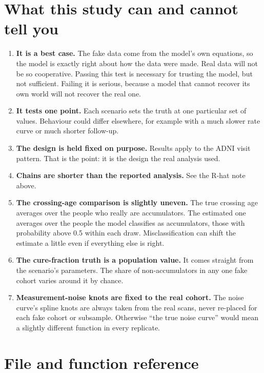 \documentclass[11pt]{article}
\begin{document}
\section{What this study can and cannot tell you}

\begin{enumerate}
  \item \textbf{It is a best case.} The fake data come from the model's own equations, so the model is exactly right about how the data were made. Real data will not be so cooperative. Passing this test is necessary for trusting the model, but not sufficient. Failing it is serious, because a model that cannot recover its own world will not recover the real one.
  \item \textbf{It tests one point.} Each scenario sets the truth at one particular set of values. Behaviour could differ elsewhere, for example with a much slower rate curve or much shorter follow-up.
  \item \textbf{The design is held fixed on purpose.} Results apply to the ADNI visit pattern. That is the point: it is the design the real analysis used.
  \item \textbf{Chains are shorter than the reported analysis.} See the R-hat note above.
  \item \textbf{The crossing-age comparison is slightly uneven.} The true crossing age averages over the people who really are accumulators. The estimated one averages over the people the model classifies as accumulators, those with probability above 0.5 within each draw. Misclassification can shift the estimate a little even if everything else is right.
  \item \textbf{The cure-fraction truth is a population value.} It comes straight from the scenario's parameters. The share of non-accumulators in any one fake cohort varies around it by chance.
  \item \textbf{Measurement-noise knots are fixed to the real cohort.} The noise curve's spline knots are always taken from the real scans, never re-placed for each fake cohort or subsample. Otherwise ``the true noise curve'' would mean a slightly different function in every replicate.
\end{enumerate}

\section{File and function reference}
\end{document}
